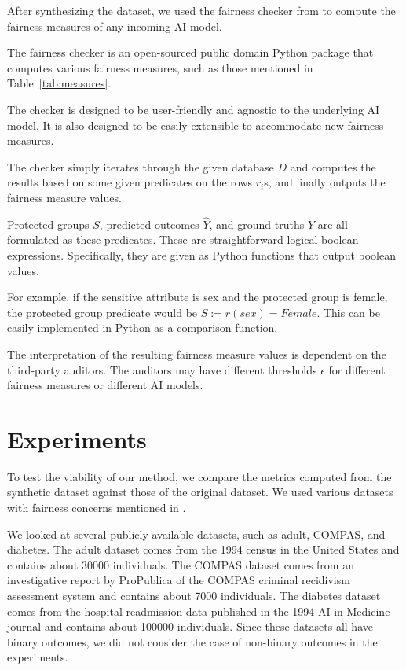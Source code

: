 \documentclass[manuscript,screen,review,anonymous]{acmart}
\newcommand{\db}{D}
\begin{document}
After synthesizing the dataset, we used the fairness checker from \cite{yuan2024ensuring} to compute the fairness measures of any incoming AI model.

The fairness checker is an open-sourced public domain Python package that computes various fairness measures, such as those mentioned in Table~\ref{tab:measures}.

The checker is designed to be user-friendly and agnostic to the underlying AI model. It is also designed to be easily extensible to accommodate new fairness measures.

The checker simply iterates through the given database $\db$ and computes the results based on some given predicates on the rows $r_i$s, and finally outputs the fairness measure values.

Protected groups $S$, predicted outcomes $\hat{Y}$, and ground truths $Y$ are all formulated as these predicates. These are straightforward logical boolean expressions. Specifically, they are given as Python functions that output boolean values.

For example, if the sensitive attribute is sex and the protected group is female, the protected group predicate would be $S := r(sex) = Female$. This can be easily implemented in Python as a comparison function.

The interpretation of the resulting fairness measure values is dependent on the third-party auditors. The auditors may have different thresholds $\epsilon$ for different fairness measures or different AI models.

\section{Experiments}

To test the viability of our method, we compare the metrics computed from the synthetic dataset against those of the original dataset. We used various datasets with fairness concerns mentioned in \cite{pessach2022review}.

We looked at several publicly available datasets, such as adult\cite{adult_2,Kaggle_Adult_Census_Income}, COMPAS\cite{larson2016propublica,Kaggle_COMPAS_Dataset}, and diabetes\cite{diabetes_34,Kaggle_Diabetes_Prediction}. The adult dataset comes from the 1994 census in the United States and contains about 30000 individuals. The COMPAS dataset comes from an investigative report by ProPublica of the COMPAS criminal recidivism assessment system and contains about 7000 individuals. The diabetes dataset comes from the hospital readmission data published in the 1994 AI in Medicine journal and contains about 100000 individuals. Since these datasets all have binary outcomes, we did not consider the case of non-binary outcomes in the experiments.
\end{document}
